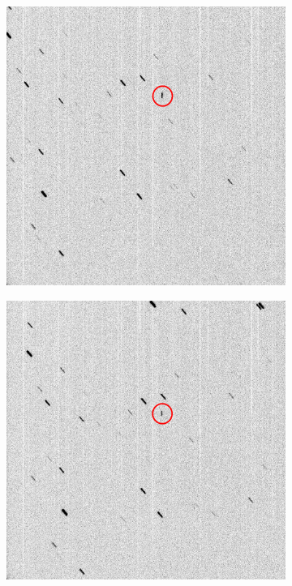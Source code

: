 \begin{figure}[!h]
    \begin{subfigure}{.3\textwidth}
        \centering
        \includegraphics[width=\textwidth]{images/StreakStreak1.png}
        \label{fig:streakstreak1}
    \end{subfigure}
    \hfill
    \begin{subfigure}{.3\textwidth}
        \centering
        \includegraphics[width=\textwidth]{images/StreakStreak2.png}

\end{subfigure}
\end{figure}
